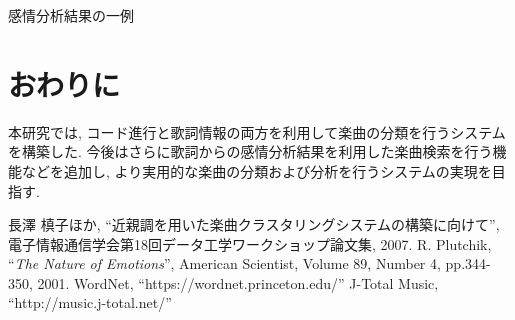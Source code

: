 \documentclass{jpreprint}
\begin{document}
\begin{multicols}{2}
\begin{figurehere}
  \centering
  \vspace{-1.0cm}
  \caption{感情分析結果の一例}
  \label{fig:a_score}
\end{figurehere}

\section{おわりに}
本研究では, 
コード進行と歌詞情報の両方を利用して楽曲の分類を行うシステムを構築した.
今後はさらに歌詞からの感情分析結果を利用した楽曲検索を行う機能などを追加し,
より実用的な楽曲の分類および分析を行うシステムの実現を目指す.
%
%

{\small
\begin{thebibliography}{99}
    長澤 槙子ほか, 
    “近親調を用いた楽曲クラスタリングシステムの構築に向けて”,
    電子情報通信学会第18回データ工学ワークショップ論文集, 2007.
    R. Plutchik,
    “\textit{The Nature of Emotions}”,
    American Scientist, Volume 89, Number 4, pp.344-350, 2001.
    WordNet, “https://wordnet.princeton.edu/”
    J-Total Music, “http://music.j-total.net/”
\end{thebibliography}
}

\end{multicols}
\end{document}
